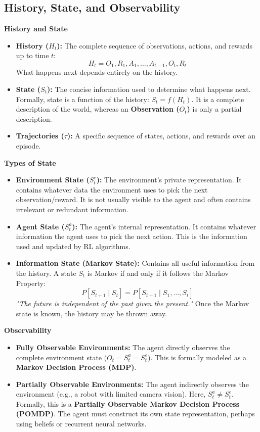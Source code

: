 \subsection{\textcolor{secondary}{History, State, and Observability}}

\textbf{\textcolor{primary}{History and State}}
\begin{itemize}
    \item \textbf{History ($H_t$):} The complete sequence of observations, actions, and rewards up to time $t$: 
    \[ H_t = O_1, R_1, A_1, \dots, A_{t-1}, O_t, R_t \]
    What happens next depends entirely on the history.
    \item \textbf{State ($S_t$):} The concise information used to determine what happens next. Formally, state is a function of the history: $S_t = f(H_t)$. It is a complete description of the world, whereas an \textbf{Observation ($O_t$)} is only a partial description.
    \item \textbf{Trajectories ($\tau$):} A specific sequence of states, actions, and rewards over an episode.
\end{itemize}

\textbf{\textcolor{primary}{Types of State}}
\begin{itemize}
    \item \textbf{Environment State ($S_t^e$):} The environment's private representation. It contains whatever data the environment uses to pick the next observation/reward. It is not usually visible to the agent and often contains irrelevant or redundant information.
    \item \textbf{Agent State ($S_t^a$):} The agent's internal representation. It contains whatever information the agent uses to pick the next action. This is the information used and updated by RL algorithms.
    \item \textbf{Information State (Markov State):} Contains all useful information from the history. A state $S_t$ is Markov if and only if it follows the Markov Property: 
    \[ P[S_{t+1} \mid S_t] = P[S_{t+1} \mid S_1, \dots, S_t] \]
    \textit{"The future is independent of the past given the present."} Once the Markov state is known, the history may be thrown away.
\end{itemize}

\textbf{\textcolor{primary}{Observability}}
\begin{itemize}
    \item \textbf{Fully Observable Environments:} The agent directly observes the complete environment state ($O_t = S_t^a = S_t^e$). This is formally modeled as a \textbf{Markov Decision Process (MDP)}.
    \item \textbf{Partially Observable Environments:} The agent indirectly observes the environment (e.g., a robot with limited camera vision). Here, $S_t^a \neq S_t^e$. Formally, this is a \textbf{Partially Observable Markov Decision Process (POMDP)}. The agent must construct its own state representation, perhaps using beliefs or recurrent neural networks.
\end{itemize}



